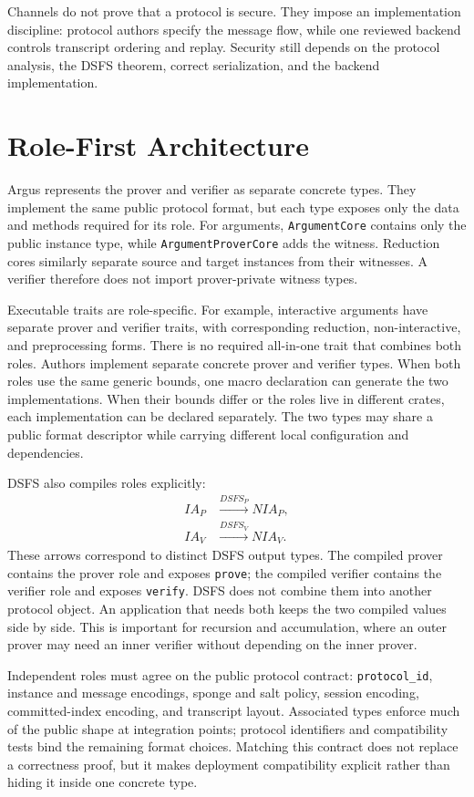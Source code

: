 \documentclass[11pt]{article}
\begin{document}
Channels do not prove that a protocol is secure. They impose an implementation
discipline: protocol authors specify the message flow, while one reviewed
backend controls transcript ordering and replay. Security still depends on the
protocol analysis, the DSFS theorem, correct serialization, and the backend
implementation.

\section{Role-First Architecture}

Argus represents the prover and verifier as separate concrete types. They
implement the same public protocol format, but each type exposes only the data
and methods required for its role. For arguments, \texttt{ArgumentCore}
contains only the public instance type, while \texttt{ArgumentProverCore} adds
the witness. Reduction cores similarly separate source and target instances
from their witnesses. A verifier therefore does not import prover-private
witness types.

Executable traits are role-specific. For example, interactive arguments have
separate prover and verifier traits, with corresponding reduction,
non-interactive, and preprocessing forms. There is no required all-in-one trait
that combines both roles. Authors implement separate concrete prover and
verifier types. When both roles use the same generic bounds, one macro
declaration can generate the two implementations. When their bounds differ or
the roles live in different crates, each implementation can be declared
separately. The two types may share a public format descriptor while carrying
different local configuration and dependencies.

DSFS also compiles roles explicitly:
\[
\begin{aligned}
  IA_P &\xrightarrow{DSFS_P} NIA_P,\\
  IA_V &\xrightarrow{DSFS_V} NIA_V.
\end{aligned}
\]
These arrows correspond to distinct DSFS output types. The compiled prover
contains the prover role and exposes \texttt{prove}; the compiled verifier
contains the verifier role and exposes \texttt{verify}. DSFS does not combine
them into another protocol object. An application that needs both keeps the two
compiled values side by side. This is important for recursion and
accumulation, where an outer prover may need an inner verifier without
depending on the inner prover.

Independent roles must agree on the public protocol contract:
\texttt{protocol\_id}, instance and message encodings, sponge and salt policy,
session encoding, committed-index encoding, and transcript layout. Associated
types enforce much of the public shape at integration points; protocol
identifiers and compatibility tests bind the remaining format choices.
Matching this contract does not replace a correctness proof, but it makes
deployment compatibility explicit rather than hiding it inside one concrete
type.
\end{document}
